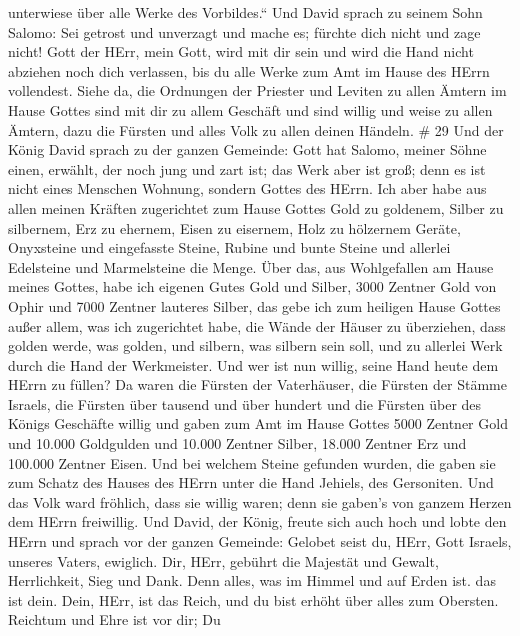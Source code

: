 unterwiese über alle Werke des Vorbildes.``  Und David
sprach zu seinem Sohn Salomo: Sei getrost und unverzagt und mache es;
fürchte dich nicht und zage nicht! Gott der HErr, mein Gott, wird mit
dir sein und wird die Hand nicht abziehen noch dich verlassen, bis du
alle Werke zum Amt im Hause des HErrn vollendest.  Siehe
da, die Ordnungen der Priester und Leviten zu allen Ämtern im Hause
Gottes sind mit dir zu allem Geschäft und sind willig und weise zu allen
Ämtern, dazu die Fürsten und alles Volk zu allen deinen Händeln. \# 29
 Und der König David sprach zu der ganzen Gemeinde: Gott hat
Salomo, meiner Söhne einen, erwählt, der noch jung und zart ist; das
Werk aber ist groß; denn es ist nicht eines Menschen Wohnung, sondern
Gottes des HErrn.  Ich aber habe aus allen meinen Kräften
zugerichtet zum Hause Gottes Gold zu goldenem, Silber zu silbernem, Erz
zu ehernem, Eisen zu eisernem, Holz zu hölzernem Geräte, Onyxsteine und
eingefasste Steine, Rubine und bunte Steine und allerlei Edelsteine und
Marmelsteine die Menge.  Über das, aus Wohlgefallen am Hause
meines Gottes, habe ich eigenen Gutes Gold und Silber,  3000
Zentner Gold von Ophir und 7000 Zentner lauteres Silber, das gebe ich
zum heiligen Hause Gottes außer allem, was ich zugerichtet habe, die
Wände der Häuser zu überziehen,  dass golden werde, was
golden, und silbern, was silbern sein soll, und zu allerlei Werk durch
die Hand der Werkmeister. Und wer ist nun willig, seine Hand heute dem
HErrn zu füllen?  Da waren die Fürsten der Vaterhäuser, die
Fürsten der Stämme Israels, die Fürsten über tausend und über hundert
und die Fürsten über des Königs Geschäfte willig  und gaben
zum Amt im Hause Gottes 5000 Zentner Gold und 10.000 Goldgulden und
10.000 Zentner Silber, 18.000 Zentner Erz und 100.000 Zentner Eisen.
 Und bei welchem Steine gefunden wurden, die gaben sie zum
Schatz des Hauses des HErrn unter die Hand Jehiels, des Gersoniten.
 Und das Volk ward fröhlich, dass sie willig waren; denn sie
gaben's von ganzem Herzen dem HErrn freiwillig. Und David, der König,
freute sich auch hoch  und lobte den HErrn und sprach vor
der ganzen Gemeinde: Gelobet seist du, HErr, Gott Israels, unseres
Vaters, ewiglich.  Dir, HErr, gebührt die Majestät und
Gewalt, Herrlichkeit, Sieg und Dank. Denn alles, was im Himmel und auf
Erden ist. das ist dein. Dein, HErr, ist das Reich, und du bist erhöht
über alles zum Obersten.  Reichtum und Ehre ist vor dir; Du
